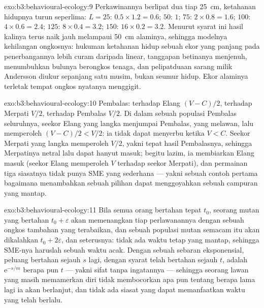 \begin{solution}{exo:b3:behavioural-ecology:9}
Perkawinannya berlipat dua tiap \qty{25}{cm}, ketahanan hidupnya turun seperlima: $L = 25$:
$0.5\times 1.2 = 0.6$; $50$: $1$; $75$: $2\times 0.8 = 1.6$; $100$:
$4\times 0.6 = 2.4$; $125$: $8\times 0.4 = 3.2$; $150$: $16\times 0.2 =
3.2$. Menurut syarat ini hasil kalinya terus naik jauh melampaui \qty{50}{cm}
alaminya, sehingga modelnya kehilangan ongkosnya: hukuman ketahanan hidup sebuah
ekor yang panjang pada penerbangannya lebih curam daripada linear, tanggapan betinanya
menjenuh, menumbuhkan bulunya berongkos tenaga, dan pelipatduaan sarang
milik Andersson diukur sepanjang satu musim, bukan seumur hidup. Ekor alaminya
terletak tempat ongkos nyatanya menggigit.
\end{solution}

\begin{solution}{exo:b3:behavioural-ecology:10}
Pembalas: terhadap Elang $(V - C)/2$, terhadap Merpati $V/2$, terhadap
Pembalas $V/2$. Di dalam sebuah populasi Pembalas seluruhnya, seekor Elang yang langka menjumpai
Pembalas, yang melawan, lalu memperoleh $(V - C)/2 < V/2$: ia tidak dapat
menyerbu ketika $V < C$. Seekor Merpati yang langka memperoleh $V/2$, yakni tepat hasil
Pembalasnya, sehingga Merpatinya netral lalu dapat hanyut masuk; begitu lazim, ia membiarkan
Elang masuk (seekor Elang memperoleh $V$ terhadap seekor Merpati), dan permainan tiga siasatnya
tidak punya SME yang sederhana --- yakni sebuah contoh pertama bagaimana menambahkan sebuah pilihan dapat
menggoyahkan sebuah campuran yang mantap.
\end{solution}

\begin{solution}{exo:b3:behavioural-ecology:11}
Bila semua orang bertahan tepat $t_{0}$, seorang mutan yang bertahan $t_{0} +
\varepsilon$ akan memenangkan tiap perlawanannya dengan sebuah ongkos tambahan yang terabaikan, dan sebuah
populasi mutan semacam itu akan dikalahkan $t_{0} + 2\varepsilon$, dan
seterusnya: tidak ada waktu tetap yang mantap, sehingga SME-nya haruslah sebuah waktu acak. Dengan
sebuah sebaran eksponensial, peluang bertahan sejauh $s$ lagi, dengan syarat telah
bertahan sejauh $t$, adalah $\mathrm{e}^{-s/m}$ berapa pun $t$
--- yakni sifat tanpa ingatannya --- sehingga seorang lawan yang masih memamerkan diri tidak membocorkan
apa pun tentang berapa lama lagi ia akan berlanjut, dan tidak ada siasat yang dapat
memanfaatkan waktu yang telah berlalu.
\end{solution}

